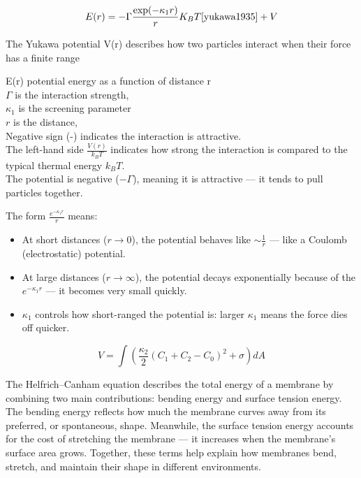 \documentclass[12pt]{article}
\begin{document}
\begin{flushleft}
\begin{equation}
E(r) = -\Gamma \frac{\exp(-\kappa_1 r)}{r} K_B T\cite{yukawa1935} +V
\end{equation}

The Yukawa potential V(r) describes how two particles interact when their force has a finite range

E(r) potential energy as a function of distance r\\
\(\Gamma\) is the interaction strength,\\
\(\kappa_1\) is the screening parameter \\
\(r\) is the distance, \\
Negative sign (-) indicates the interaction is attractive.\\
The left-hand side \( \frac{V(r)}{k_B T} \) indicates how strong the interaction is compared to the typical thermal energy \( k_B T \).\\

The potential is negative (\( -\Gamma \)), meaning it is attractive — it tends to pull particles together.

\noindent The form \( \frac{e^{-\kappa_1 r}}{r} \) means:

\begin{itemize}
    \item At short distances (\( r \to 0 \)), the potential behaves like \( \sim \frac{1}{r} \) — like a Coulomb (electrostatic) potential.
    \item At large distances (\( r \to \infty \)), the potential decays exponentially because of the \( e^{-\kappa_1 r} \) — it becomes very small quickly.
    \item \( \kappa_1 \) controls how short-ranged the potential is: larger \( \kappa_1 \) means the force dies off quicker.
\end{itemize}



\begin{equation}
V= \int \left( \frac{\kappa_2}{2} (C_1 + C_2 - C_0)^2 + \sigma \right) dA
\end{equation}

The Helfrich–Canham equation describes the total energy of a membrane by combining two main contributions: bending energy and surface tension energy. The bending energy reflects how much the membrane curves away from its preferred, or spontaneous, shape. Meanwhile, the surface tension energy accounts for the cost of stretching the membrane — it increases when the membrane's surface area grows. Together, these terms help explain how membranes bend, stretch, and maintain their shape in different environments.




\end{flushleft}
\end{document}
